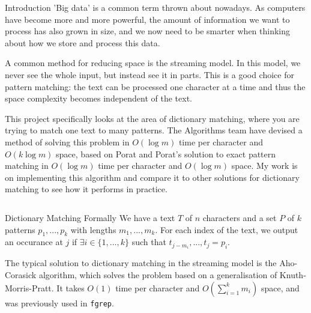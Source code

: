 \documentclass[ %
                    author={Dominic Moylett},
                    degree={MEng},
                     title={Dictionary Matching with Fingerprints},
                  subtitle={},
                      type={Research},
                      year={2015} ]{poster}
\newcommand{\nline}{
  \\\vspace{\baselineskip}
}
\begin{document}

\begin{frame}{} 

\vfill

\begin{columns}[t]
  \begin{column}{0.900\linewidth}
  \begin{block}{\Large Introduction}
  'Big data' is a common term thrown about nowadays. As computers have become more and more powerful, the amount of information we want to process has also grown in size, and we now need to be smarter when thinking about how we store and process this data.\nline

  A common method for reducing space is the streaming model. In this model, we never see the whole input, but instead see it in parts. This is a good choice for pattern matching: the text can be processed one character at a time and thus the space complexity becomes independent of the text.\nline

  This project specifically looks at the area of dictionary matching, where you are trying to match one text to many patterns. The Algorithms team have devised a method of solving this problem in $O(\log m)$ time per character and $O(k\log m)$ space, based on Porat and Porat's solution to exact pattern matching in $O(\log m)$ time per character and $O(\log m)$ space. My work is on implementing this algorithm and compare it to other solutions for dictionary matching to see how it performs in practice.
  \end{block}
  \end{column}
\end{columns}

\vfill

\begin{columns}[t]
  \begin{column}{0.422\linewidth}
  \begin{block}{\Large Dictionary Matching Formally}
  We have a text $T$ of $n$ characters and a set $P$ of $k$ patterns $p_1,...,p_k$ with lengths $m_1,...,m_k$. For each index of the text, we output an occurance at $j$ if $\exists i \in \{1,...,k\}$ such that $t_{j - m_i},...,t_j = p_i$.\nline

  The typical solution to dictionary matching in the streaming model is the Aho-Corasick algorithm, which solves the problem based on a generalisation of Knuth-Morris-Pratt. It takes $O(1)$ time per character and $O(\sum_{i =1}^km_i)$ space, and was previously used in \texttt{fgrep}.
  \end{block}
  \end{column}


\end{columns}
\end{frame}
\end{document}
